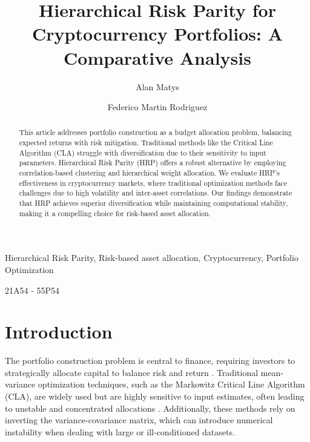 \documentclass[english]{maciarticle}
\begin{document}
\title{Hierarchical Risk Parity for Cryptocurrency Portfolios: A Comparative Analysis}

\author[$\flat$]{Alan Matys}
\author[$\flat$]{Federico Martin Rodriguez}

\maketitle

\begin{abstract}
This article addresses portfolio construction as a budget allocation problem, balancing expected returns with risk mitigation. Traditional methods like the Critical Line Algorithm (CLA) struggle with diversification due to their sensitivity to input parameters. Hierarchical Risk Parity (HRP) offers a robust alternative by employing correlation-based clustering and hierarchical weight allocation. We evaluate HRP’s effectiveness in cryptocurrency markets, where traditional optimization methods face challenges due to high volatility and inter-asset correlations. Our findings demonstrate that HRP achieves superior diversification while maintaining computational stability, making it a compelling choice for risk-based asset allocation.
\end{abstract}

\begin{keywords}
Hierarchical Risk Parity, Risk-based asset allocation, Cryptocurrency, Portfolio Optimization
\end{keywords}

\begin{mathsubclass}
21A54 - 55P54
\end{mathsubclass}

{\thispagestyle{empty}} %

\section{Introduction}

The portfolio construction problem is central to finance, requiring investors to strategically allocate capital to balance risk and return \cite{markowitz1952}. Traditional mean-variance optimization techniques, such as the Markowitz Critical Line Algorithm (CLA), are widely used but are highly sensitive to input estimates, often leading to unstable and concentrated allocations \cite{lopez2016}. Additionally, these methods rely on inverting the variance-covariance matrix, which can introduce numerical instability when dealing with large or ill-conditioned datasets.
\end{document}
